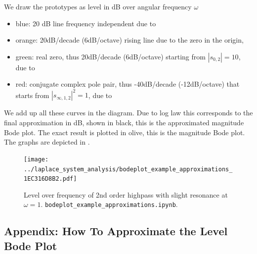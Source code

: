 \begin{Loesung}
We draw the prototypes as level in dB over angular frequency $\omega$
\begin{itemize}
\item blue: 20 dB line frequency independent due to 
\item orange: 20dB/decade (6dB/octave) rising line due to the zero in the origin,
\item green: real zero, thus 20dB/decade (6dB/octave) starting from $|s_{0,2}| = 10$, due to
\item red: conjugate complex pole pair, thus -40dB/decade (-12dB/octave) that starts from
$|s_{\infty,1,2}|^2 = 1$, due to 
\end{itemize}
We add up all these curves in the diagram. Due to log law this corresponds to the final approximation
in dB, shown in black, this is the approximated magnitude Bode plot.
The exact result is plotted in olive, this is the magnitude Bode plot.
The graphs are depicted in .
\end{Loesung}

\begin{figure}[h!]
\centering
\texttt{[image: ../laplace\_system\_analysis/bodeplot\_example\_approximations\_1EC316D8B2.pdf]}
\caption{Level over frequency of 2nd order highpass with slight resonance
at $\omega=1$. \texttt{bodeplot\_example\_approximations.ipynb}.}
\label{fig:bodeplot_example_approximations_1EC316D8B2}
\end{figure}



















\clearpage
\subsection{Appendix: How To Approximate the Level Bode Plot}
